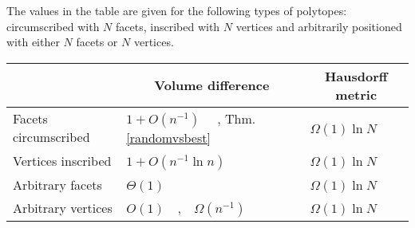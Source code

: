 The values in the table are given for the following types of polytopes: circumscribed with $N$ facets, inscribed with $N$ vertices  and arbitrarily positioned with either $N$ facets or $N$ vertices.
\begin{table}[h]
\centering
	\begin{tabular}{|l|l|l|}
		\hline
		& \multicolumn{1}{|c|}{Volume difference}                                      & \multicolumn{1}{|c|}{Hausdorff metric}                          \\ \hline
		Facets circumscribed           & $1+O(n^{-1})$   \,\,\,\, \cite{boroczky2004approximation,GruberII}, Thm. \ref{randomvsbest}         & $\Omega(1)\ln N$ \,\,\,\,\cite{boroczky2000polytopal,glasauer1996asymptotic,janson1986random} 
		\\ \hline
		Vertices inscribed      & $1+O(n^{-1}\ln n)$ \,\,\,\,\cite{GruberII,MaS1,MaS2,schutt2003polytopes} &            $\Omega(1)\ln N$ \,\,\,\,\cite{boroczky2000polytopal,glasauer1996asymptotic,janson1986random}                \\ \hline
		Arbitrary facets & $\Theta(1)$     \,\,\,\,\cite{kur2017approximation,Lud06}   &  $\Omega(1)\ln N$ \,\,\,\,\cite{boroczky2000polytopal,glasauer1996asymptotic}\\
		\hline
		Arbitrary vertices & $O(1)$  \,\, \cite{Lud06}, \,\, $\Omega(n^{-1})$ \,\, \cite{boroczky2000polytopal}  &  $\Omega(1)\ln N$ \,\,\,\,\cite{boroczky2000polytopal,glasauer1996asymptotic}\\
		\hline
	\end{tabular}
\end{table}

